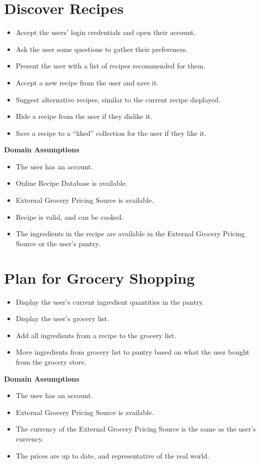 \documentclass[11pt, letterpaper]{report}
\begin{document}
\section{Discover Recipes}
\begin{itemize}
    \item Accept the users’ login credentials and open their account.
    \item Ask the user some questions to gather their preferences.
    \item Present the user with a list of recipes recommended for them.
    \item Accept a new recipe from the user and save it.
    \item Suggest alternative recipes, similar to the current recipe displayed.
    \item Hide a recipe from the user if they dislike it.
    \item Save a recipe to a “liked” collection for the user if they like it.
\end{itemize}
\textbf{Domain Assumptions}
\begin{itemize}
    \item The user has an account.
    \item Online Recipe Database is available.
    \item External Grocery Pricing Source is available.
    \item Recipe is valid, and can be cooked.
    \item The ingredients in the recipe are available in the External Grocery Pricing Source or the user’s pantry.
\end{itemize}

\section{Plan for Grocery Shopping}
\begin{itemize}
    \item Display the user’s current ingredient quantities in the pantry.
    \item Display the user’s grocery list.
    \item Add all ingredients from a recipe to the grocery list.
    \item Move ingredients from grocery list to pantry based on what the user bought from the grocery store.
\end{itemize}
\textbf{Domain Assumptions}
\begin{itemize}
    \item The user has an account.
    \item External Grocery Pricing Source is available.
    \item The currency of the External Grocery Pricing Source is the same as the user’s currency.
    \item The prices are up to date, and representative of the real world.
\end{itemize}
\end{document}
